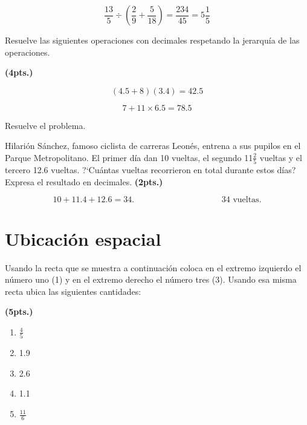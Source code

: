 \documentclass[11pt]{article}
\begin{document}
\vspace{1.5cm}

\begin{equation*}
\frac{13}{5} \div \left( \frac{2}{9} + \frac{5}{18} \right) = \frac{234}{45} = 5 \frac{1}{5}
\end{equation*}

\vspace{1.5cm}

Resuelve las siguientes operaciones con decimales respetando la jerarqu\'ia de
las operaciones. 

\hfill \textbf{(4pts.)}
\begin{multicols}{2}
\begin{equation*}
(4.5 + 8)(3.4) = 42.5
\end{equation*}

\begin{equation*}
7 + 11 \times 6.5 = 78.5
\end{equation*}
\end{multicols}

\vspace{5cm}

Resuelve el problema. 

Hilari\'on S\'anchez, famoso ciclista de carreras Leon\'es, entrena a sus
pupilos en el Parque Metropolitano. El primer d\'ia dan 10 vueltas, el segundo
11$\frac{2}{5}$ vueltas y el tercero 12.6 vueltas. ?`Cu\'antas vueltas
recorrieron en total durante estos d\'ias? Expresa el resultado en decimales.
\hfill \textbf{(2pts.)}

\vspace{1.5cm}

\begin{equation*}
10 + 11.4 + 12.6 = 34. \qquad\qquad\qquad\qquad\qquad \text{ 34 vueltas.}
\end{equation*}

\vspace{1.5cm}

\section{Ubicaci\'on espacial}

Usando la recta que se muestra a continuaci\'on coloca en el extremo izquierdo
el n\'umero uno (1) y en el extremo derecho el n\'umero tres (3). Usando esa
misma recta ubica las siguientes cantidades: 

\hfill \textbf{(5pts.)}

\begin{multicols}{5}
\begin{enumerate}[label=\alph*)] \itemsep-.3em
\item $\displaystyle\frac{4}{5} $ \hspace{5mm} 
\item 1.9 
\item 2.6 
\item 1.1
\item $\displaystyle\frac{11}{6} $
\end{enumerate}
\end{multicols}
\end{document}
